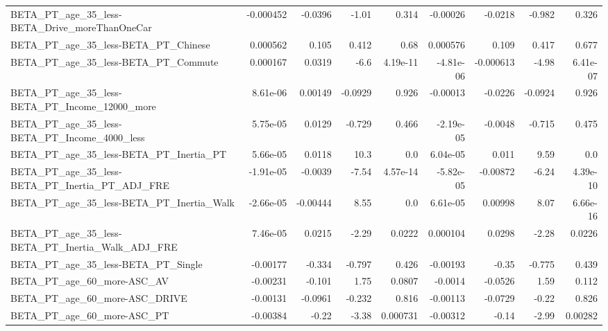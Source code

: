 \begin{tabular}{lrrrrrrrr}
BETA\_PT\_age\_35\_less-BETA\_Drive\_moreThanOneCar      &   -0.000452 &      -0.0396 &    -1.01 &    0.314 &   -0.00026 &     -0.0218 &       -0.982 &         0.326 \\
BETA\_PT\_age\_35\_less-BETA\_PT\_Chinese                &    0.000562 &        0.105 &    0.412 &     0.68 &   0.000576 &       0.109 &        0.417 &         0.677 \\
BETA\_PT\_age\_35\_less-BETA\_PT\_Commute                &    0.000167 &       0.0319 &     -6.6 & 4.19e-11 &  -4.81e-06 &   -0.000613 &        -4.98 &      6.41e-07 \\
BETA\_PT\_age\_35\_less-BETA\_PT\_Income\_12000\_more      &    8.61e-06 &      0.00149 &  -0.0929 &    0.926 &   -0.00013 &     -0.0226 &      -0.0924 &         0.926 \\
BETA\_PT\_age\_35\_less-BETA\_PT\_Income\_4000\_less       &    5.75e-05 &       0.0129 &   -0.729 &    0.466 &  -2.19e-05 &     -0.0048 &       -0.715 &         0.475 \\
BETA\_PT\_age\_35\_less-BETA\_PT\_Inertia\_PT             &    5.66e-05 &       0.0118 &     10.3 &      0.0 &   6.04e-05 &       0.011 &         9.59 &           0.0 \\
BETA\_PT\_age\_35\_less-BETA\_PT\_Inertia\_PT\_ADJ\_FRE     &   -1.91e-05 &      -0.0039 &    -7.54 & 4.57e-14 &  -5.82e-05 &    -0.00872 &        -6.24 &      4.39e-10 \\
BETA\_PT\_age\_35\_less-BETA\_PT\_Inertia\_Walk           &   -2.66e-05 &     -0.00444 &     8.55 &      0.0 &   6.61e-05 &     0.00998 &         8.07 &      6.66e-16 \\
BETA\_PT\_age\_35\_less-BETA\_PT\_Inertia\_Walk\_ADJ\_FRE   &    7.46e-05 &       0.0215 &    -2.29 &   0.0222 &   0.000104 &      0.0298 &        -2.28 &        0.0226 \\
BETA\_PT\_age\_35\_less-BETA\_PT\_Single                 &    -0.00177 &       -0.334 &   -0.797 &    0.426 &   -0.00193 &       -0.35 &       -0.775 &         0.439 \\
BETA\_PT\_age\_60\_more-ASC\_AV                         &    -0.00231 &       -0.101 &     1.75 &   0.0807 &    -0.0014 &     -0.0526 &         1.59 &         0.112 \\
BETA\_PT\_age\_60\_more-ASC\_DRIVE                      &    -0.00131 &      -0.0961 &   -0.232 &    0.816 &   -0.00113 &     -0.0729 &        -0.22 &         0.826 \\
BETA\_PT\_age\_60\_more-ASC\_PT                         &    -0.00384 &        -0.22 &    -3.38 & 0.000731 &   -0.00312 &       -0.14 &        -2.99 &       0.00282 \\

\end{tabular}

